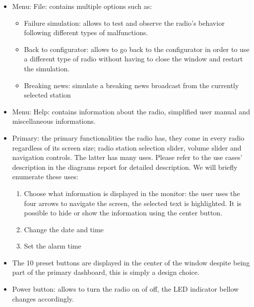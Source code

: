 \documentclass[11pt]{article}
\begin{document}
\begin{itemize}
\item Menu: File: contains multiple options such as:
\begin{itemize}
\item Failure simulation: allows to test and observe the radio's behavior following different types of malfunctions.
\item Back to configurator: allows to go back to the configurator in order to use a different type of radio without having to close the window and restart the simulation.
\item Breaking news: simulate a breaking news broadcast from the currently selected station
\end{itemize}
\item Menu: Help: contains information about the radio, simplified user manual and miscellaneous informations.
\item Primary: the primary functionalities the radio has, they come in every radio regardless of its screen size; radio station selection slider, volume slider and navigation controls. The latter has many uses. Please refer to the use cases' description in the diagrams report for detailed description. We will briefly enumerate these uses:
\begin{enumerate}
\item Choose what information is displayed in the monitor: the user uses the four arrows to navigate the screen, the selected text is highlighted. It is possible to hide or show the information using the center button.
\item Change the date and time
\item Set the alarm time
\end{enumerate}
\item The 10 preset buttons are displayed in the center of the window despite being part of the primary dashboard, this is simply a design choice.
\item Power button: allows to turn the radio on of off, the LED indicator bellow changes accordingly.
\end{itemize}
\end{document}
